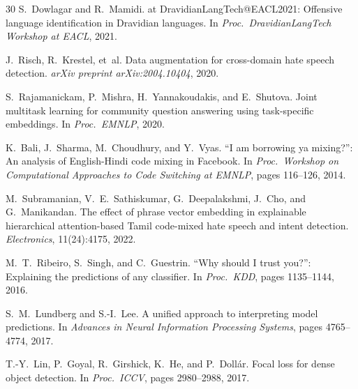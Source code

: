 \documentclass[12pt, a4paper]{article}
\begin{document}
\begin{thebibliography}{30}
S.~Dowlagar and R.~Mamidi.
 at {DravidianLangTech@EACL2021}: Offensive language identification in Dravidian languages.
\newblock In \textit{Proc.\ DravidianLangTech Workshop at EACL}, 2021.

J.~Risch, R.~Krestel, et~al.
\newblock Data augmentation for cross-domain hate speech detection.
\newblock \textit{arXiv preprint arXiv:2004.10404}, 2020.

S.~Rajamanickam, P.~Mishra, H.~Yannakoudakis, and E.~Shutova.
\newblock Joint multitask learning for community question answering using task-specific embeddings.
\newblock In \textit{Proc.\ EMNLP}, 2020.

K.~Bali, J.~Sharma, M.~Choudhury, and Y.~Vyas.
\newblock ``{I} am borrowing ya mixing?'': An analysis of {English-Hindi} code mixing in {Facebook}.
\newblock In \textit{Proc.\ Workshop on Computational Approaches to Code Switching at EMNLP}, pages 116--126, 2014.

M.~Subramanian, V.~E.~Sathiskumar, G.~Deepalakshmi, J.~Cho, and G.~Manikandan.
\newblock The effect of phrase vector embedding in explainable hierarchical attention-based Tamil code-mixed hate speech and intent detection.
\newblock \textit{Electronics}, 11(24):4175, 2022.

M.~T.~Ribeiro, S.~Singh, and C.~Guestrin.
\newblock ``{Why} should {I} trust you?'': Explaining the predictions of any classifier.
\newblock In \textit{Proc.\ KDD}, pages 1135--1144, 2016.

S.~M.~Lundberg and S.-I.~Lee.
\newblock A unified approach to interpreting model predictions.
\newblock In \textit{Advances in Neural Information Processing Systems}, pages 4765--4774, 2017.

T.-Y.~Lin, P.~Goyal, R.~Girshick, K.~He, and P.~Doll{\'a}r.
\newblock Focal loss for dense object detection.
\newblock In \textit{Proc.\ ICCV}, pages 2980--2988, 2017.

\end{thebibliography}
\end{document}
